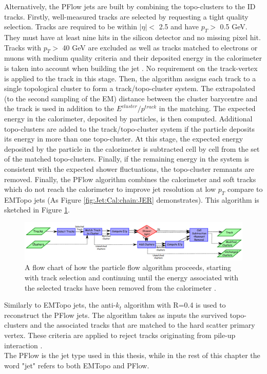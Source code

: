 Alternatively, the PFlow jets are built by combining the topo-clusters to the ID tracks. Firstly, well-measured tracks are selected by requesting a tight quality selection. Tracks are required to be within $|\eta|<$ 2.5 and have $p_T>$ 0.5 GeV. They must have at least nine hits in the silicon detector and no missing pixel hit. Tracks with $p_T>$ 40 GeV are excluded as well as tracks matched to electrons or muons with medium quality criteria and their deposited energy in the calorimeter is taken into account when building the jet \cite{PFlow_Reco}. No requirement on the track-vertex is applied to the track in this stage. Then, the algorithm assigns each track to a single topological cluster to form a track/topo-cluster system. The extrapolated (to the second sampling of the EM) distance between the cluster barycentre and the track is used in addition to the $E^{cluster}/p^{track}$ in the matching. The expected energy in the calorimeter, deposited by particles, is then computed. Additional topo-clusters are added to the track/topo-cluster system if the particle deposits its energy in more than one topo-cluster. At this stage, the expected energy deposited by the particle in the calorimeter is subtracted cell by cell from the set of the matched topo-clusters. Finally, if the remaining energy in the system is consistent with the expected shower fluctuations, the topo-cluster remnants are removed. Finally, the PFlow algorithm combines the calorimeter and soft tracks which do not reach the calorimeter to improve jet resolution at low $p_T$ compare to EMTopo jets (As Figure \ref{fig:Jet:Cal:chain:JER} demonstrates). This algorithm is sketched in Figure \ref{fig:Jet:JR:PFlowSketch}. 

\begin{figure}[htbp]
    \centering
    \includegraphics[width=1.\textwidth]{Ch4/Img/PFlow_Algo.png}
    \caption{A flow chart of how the particle flow algorithm proceeds, starting with track selection and continuing until the energy associated with the selected tracks have been removed from the calorimeter \cite{PFlow_Reco}.}
    \label{fig:Jet:JR:PFlowSketch}
\end{figure}
Similarly to EMTopo jets, the anti-$k_t$ algorithm with R=0.4 is used to reconstruct the PFlow jets. The algorithm takes as inputs the survived topo-clusters and the associated tracks that are matched to the hard scatter primary vertex. These criteria are applied to reject tracks originating from pile-up interaction \cite{Jet_pileUp}. \\
The PFlow is the jet type used in this thesis, while in the rest of this chapter the word "jet" refers to both EMTopo and PFlow.

